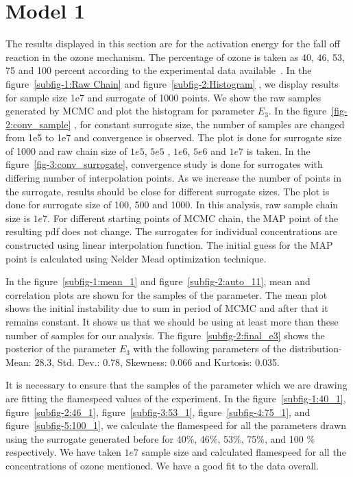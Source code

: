 \section{Model 1}

The results displayed in this section are for the
activation energy for the fall off reaction in the ozone
mechanism. The percentage of ozone is taken as 40, 46, 53, 75 and 100
percent according to the experimental data
available~\cite{Streng}. In the
figure~\ref{subfig-1:Raw Chain} and figure~\ref{subfig-2:Histogram} ,  we display results for sample size 1e7 and surrogate
of 1000 points. We show the raw samples generated by MCMC and plot
 the histogram for parameter $E_3$. In the figure~\ref{fig-2:conv_sample} , for
constant surrogate size, the number of samples are changed from 1e5 to
1e7 and convergence is observed. The plot is done for surrogate size of 1000 and raw chain size of $1e5$, $5e5$ , $1e6$, $5e6$ and $1e7$ is taken. In the figure~\ref{fig-3:conv_surrogate},
convergence study is done for surrogates with differing number of
interpolation points. As we increase the number of points in the surrogate, results should be close for different surrogate sizes. The plot is done for surrogate size of 100, 500 and 1000. In this analysis, raw sample chain size is $1e7$. For different starting points of MCMC chain, the MAP point of the resulting pdf does not change. The surrogates for individual
concentrations are constructed using linear interpolation
function. The initial guess for the MAP point is calculated using
Nelder Mead optimization technique. 

\bigskip

In the
figure~\ref{subfig-1:mean_1} and figure~\ref{subfig-2:auto_11},  mean and correlation plots are shown for
the samples of the parameter. The mean plot shows the initial instability due to sum in period of MCMC and after that it remains constant. It shows us that we should be using at least more than these number of samples for our analysis. The figure~\ref{subfig-2:final_e3} shows the posterior of the parameter $E_3$ with the following parameters of the distribution- Mean:  28.3, Std. Dev.:  0.78, Skewness:  0.066 and Kurtosis:  0.035.

\bigskip

 It is necessary to ensure that the samples of the parameter which we are drawing are fitting the flamespeed values of the experiment. In the figure~\ref{subfig-1:40_1}, figure~\ref{subfig-2:46_1}, figure~\ref{subfig-3:53_1}, figure~\ref{subfig-4:75_1}, and figure~\ref{subfig-5:100_1},   we calculate the flamespeed for all the parameters drawn using the surrogate generated before for 40$\%$, 46$\%$, 53$\%$, 75$\%$, and 100 $\%$ respectively. We have taken $1e7$ sample size and calculated flamespeed for all the concentrations of ozone mentioned. We have a good fit to the data overall.



